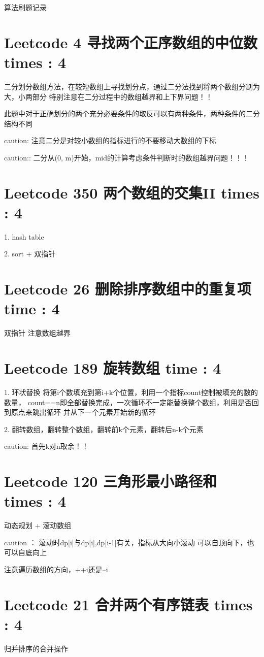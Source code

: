 \documentclass[UTF8]{ctexart}
\begin{document}
算法刷题记录

\section{Leetcode 4 寻找两个正序数组的中位数 times : 4}
二分划分数组方法，在较短数组上寻找划分点，通过二分法找到将两个数组分割为大，小两部分
特别注意在二分过程中的数组越界和上下界问题！！

此题中对于正确划分的两个充分必要条件的取反可以有两种条件，两种条件的二分结构不同

caution: 注意二分是对较小数组的指标进行的不要移动大数组的下标

caution:: 二分从(0, m)开始，mid的计算考虑条件判断时的数组越界问题！！！


\section{Leetcode 350 两个数组的交集II times : 4}
1. hash table

2. sort + 双指针

\section{Leetcode 26 删除排序数组中的重复项 time : 4}
双指针
注意数组越界

\section{Leetcode 189 旋转数组 time : 4}
1. 环状替换 将第i个数填充到第i+k个位置，利用一个指标count控制被填充的数的数量，
count==n即全部替换完成，一次循环不一定能替换整个数组，利用是否回到原点来跳出循环
并从下一个元素开始新的循环

2. 翻转数组，翻转整个数组，翻转前k个元素，翻转后n-k个元素

caution: 首先k对n取余！！

\section{Leetcode 120 三角形最小路径和 times : 4}
动态规划 + 滚动数组

caution ： 滚动时dp[i]与dp[i],dp[i-1]有关，指标从大向小滚动
可以自顶向下，也可以自底向上

注意遍历数组的方向，++i还是--i

\section{Leetcode 21 合并两个有序链表 times : 4}
归并排序的合并操作
\end{document}
